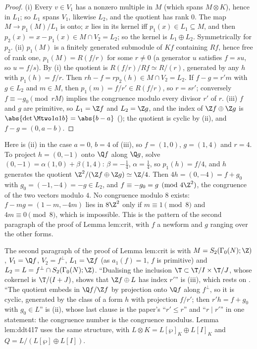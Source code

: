\begin{proof}
(i) Every $v\in V_1$ has a nonzero multiple in $M$ (which spans $M\otimes K$), hence in $L_1$; so $L_1$ spans $V_1$, likewise $L_2$, and the
quotient has rank $0$. The map $M\to p_1(M)/L_1$ is onto; $x$ lies in its kernel iff $p_1(x)\in L_1\subseteq M$, and then
$p_2(x)=x-p_1(x)\in M\cap V_2=L_2$; so the kernel is $L_1\oplus L_2$. Symmetrically for $p_2$.
(ii) $p_1(M)$ is a finitely generated submodule of $Kf$ containing $Rf$, hence free of rank one, $p_1(M)=R(f/r)$ for some $r\ne0$ (a generator
$u$ satisfies $f=su$, so $u=f/s$). By (i) the quotient is $R(f/r)/Rf\simeq R/(r)$, generated by any $h$ with $p_1(h)=f/r$. Then
$rh-f=rp_2(h)\in M\cap V_2=L_2$. If $f-g=r'm$ with $g\in L_2$ and $m\in M$, then $p_1(m)=f/r'\in R(f/r)$, so $r=sr'$; conversely
$f\equiv-g_0\pmod{rM}$ implies the congruence modulo every divisor $r'$ of $r$.
(iii) $f$ and $g$ are primitive, so $L_1=\Z f$ and $L_2=\Z g$, and the index of $\Z f\oplus\Z g$ is $\abs{\det\Mtwo1a1b}=\abs{b-a}$ ();
the quotient is cyclic by (ii), and $f-g=(0,a-b)$.
\end{proof}

Here is (ii) in the case $a=0$, $b=4$ of (iii), so $f=(1,0)$, $g=(1,4)$ and $r=4$. To project $h=(0,-1)$ onto $\Q f$ along $\Q g$, solve
$(0,-1)=\alpha(1,0)+\beta(1,4)$: $\beta=-\frac14$, $\alpha=\frac14$, so $p_1(h)=f/4$, and $h$ generates the quotient $\Z^2/(\Z f\oplus\Z g)\simeq\Z/4$.
Then $4h=(0,-4)=f+g_0$ with $g_0=(-1,-4)=-g\in L_2$, and $f\equiv-g_0=g\pmod{4\Z^2}$, the congruence of the two vectors modulo $4$. No
congruence modulo $8$ exists: $f-mg=(1-m,-4m)$ lies in $8\Z^2$ only if $m\equiv1\pmod8$ and $4m\equiv0\pmod8$, which is impossible.
This is the pattern of the second paragraph of the proof of Lemma lem:crit, with $f$ a newform and $g$ ranging over the other forms.

\begin{paperlink}\label{pl:modules:crit-second}
The second paragraph of the proof of Lemma lem:crit is  with
$M=S_2(\Gamma_0(N);\Z)$, $V_1=\Q f$, $V_2=f^\perp$, $L_1=\Z f$ (as $a_1(f)=1$, $f$ is primitive) and $L_2=L=f^\perp\cap S_2(\Gamma_0(N);\Z)$.
``Dualising the inclusion $\T\subset\T/I\times\T/J$, whose cokernel is $\T/(I+J)$, shows that $\Z f\oplus L$ has index $r'$'' is
(iii), which rests on . ``The quotient embeds in $\Q f/\Z f$ by
projection onto $\Q f$ along $f^\perp$, so it is cyclic, generated by the class of a form $h$ with projection $f/r'$; then $r'h=f+g_0$ with
$g_0\in L$'' is (ii), whose last clause is the paper's ``$r'\le r$'' and ``$r\mid r'$'' in one
statement: the congruence number is the congruence modulus. Lemma lem:ddt417 uses the same structure, with
$L\otimes K=L[\wp]_K\oplus L[I]_K$ and $Q=L/(L[\wp]\oplus L[I])$.
\end{paperlink}

